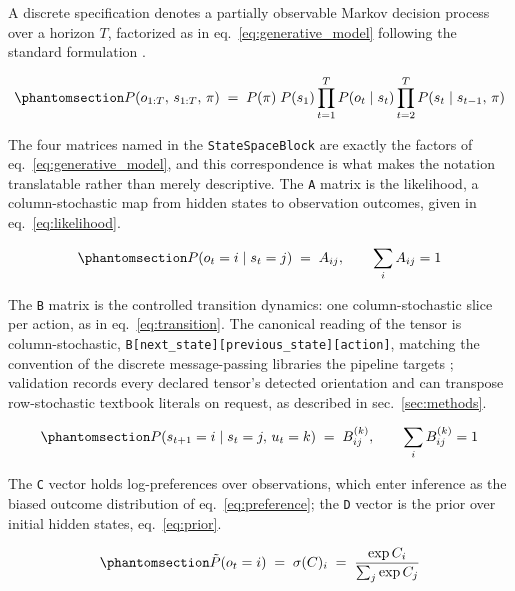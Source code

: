 \documentclass[
  english,
  9pt,
]{extarticle}
\begin{document}
A discrete specification denotes a partially observable Markov decision
process over a horizon \(T\), factorized as in
eq.~\ref{eq:generative_model} following the standard formulation
\citep{dacosta2020, smith2022}.

\begin{equation}\protect\phantomsection\label{eq:generative_model}{
P(o_{1:T},\, s_{1:T},\, \pi) \;=\; P(\pi)\; P(s_1) \prod_{t=1}^{T} P(o_t \mid s_t) \prod_{t=2}^{T} P(s_t \mid s_{t-1},\, \pi)
}\end{equation}

The four matrices named in the \texttt{StateSpaceBlock} are exactly the
factors of eq.~\ref{eq:generative_model}, and this correspondence is
what makes the notation translatable rather than merely descriptive. The
\texttt{A} matrix is the likelihood, a column-stochastic map from hidden
states to observation outcomes, given in eq.~\ref{eq:likelihood}.

\begin{equation}\protect\phantomsection\label{eq:likelihood}{
P(o_t = i \mid s_t = j) \;=\; A_{ij}, \qquad \sum_i A_{ij} = 1
}\end{equation}

The \texttt{B} matrix is the controlled transition dynamics: one
column-stochastic slice per action, as in eq.~\ref{eq:transition}. The
canonical reading of the tensor is column-stochastic,
\texttt{B{[}next\_state{]}{[}previous\_state{]}{[}action{]}}, matching
the convention of the discrete message-passing libraries the pipeline
targets \citep{heins2022}; validation records every declared tensor's
detected orientation and can transpose row-stochastic textbook literals
on request, as described in sec.~\ref{sec:methods}.

\begin{equation}\protect\phantomsection\label{eq:transition}{
P(s_{t+1} = i \mid s_t = j,\, u_t = k) \;=\; B^{(k)}_{ij}, \qquad \sum_i B^{(k)}_{ij} = 1
}\end{equation}

The \texttt{C} vector holds log-preferences over observations, which
enter inference as the biased outcome distribution of
eq.~\ref{eq:preference}; the \texttt{D} vector is the prior over initial
hidden states, eq.~\ref{eq:prior}.

\begin{equation}\protect\phantomsection\label{eq:preference}{
\tilde{P}(o_t = i) \;=\; \sigma(C)_i \;=\; \frac{\exp C_i}{\sum_j \exp C_j}
}\end{equation}
\end{document}
